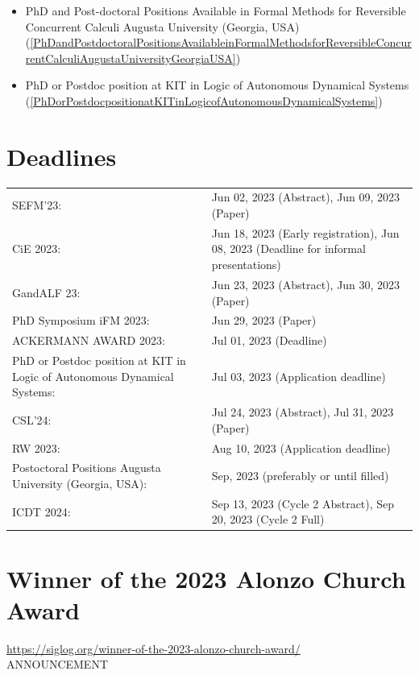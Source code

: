 \documentclass[prodmode,acmtecs]{acmsmall} %
\begin{document}
\begin{itemize}
\begin{itemize}\item PhD and Post-doctoral Positions Available in Formal Methods for Reversible Concurrent Calculi Augusta University (Georgia, USA) (\cref{PhDandPostdoctoralPositionsAvailableinFormalMethodsforReversibleConcurrentCalculiAugustaUniversityGeorgiaUSA})
\item PhD or Postdoc position at KIT in Logic of Autonomous Dynamical Systems (\cref{PhDorPostdocpositionatKITinLogicofAutonomousDynamicalSystems})
\end{itemize} 
\end{itemize}\section{Deadlines}\label{deadlines}\begin{tabulary}{\linewidth}{LL}SEFM'23:  & Jun 02, 2023 (Abstract), Jun 09, 2023 (Paper) \\
CiE 2023:  & Jun 18, 2023 (Early registration), Jun 08, 2023 (Deadline for informal presentations) \\
GandALF 23:  & Jun 23, 2023 (Abstract), Jun 30, 2023 (Paper) \\
PhD Symposium iFM 2023:  & Jun 29, 2023 (Paper) \\
ACKERMANN AWARD 2023:  & Jul 01, 2023 (Deadline) \\
PhD or Postdoc position at KIT in Logic of Autonomous Dynamical Systems:  & Jul 03, 2023 (Application deadline) \\
CSL'24:  & Jul 24, 2023 (Abstract), Jul 31, 2023 (Paper) \\
RW 2023:  & Aug 10, 2023 (Application deadline) \\
Postoctoral Positions Augusta University (Georgia, USA):  & Sep, 2023 (preferably or until filled) \\
ICDT 2024:  & Sep 13, 2023 (Cycle 2 Abstract), Sep 20, 2023 (Cycle 2 Full) \\
\end{tabulary}
\section{Winner of the 2023 Alonzo Church Award}\label{Winnerofthe2023AlonzoChurchAward}  \href{https://siglog.org/winner-of-the-2023-alonzo-church-award/}{https://siglog.org/winner-of-the-2023-alonzo-church-award/}\\ 
ANNOUNCEMENT 
\end{document}
